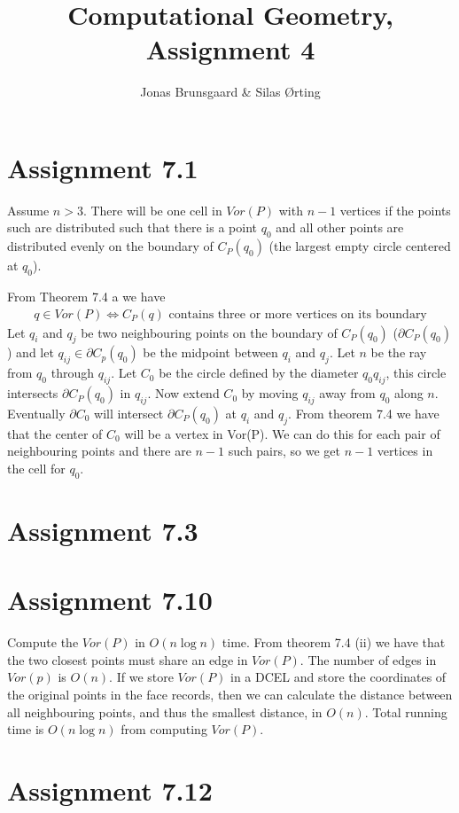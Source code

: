 \documentclass[10pt,a4paper,final,oneside,openany,article,oldfontcommands]{memoir}
\title{Computational Geometry, Assignment 4}
\author{
    Jonas Brunsgaard \& Silas Ørting
}
\begin{document}
\maketitle


\chapter*{Assignment 7.1}
Assume $n > 3$. There will be one cell in $Vor(P)$ with $n-1$ vertices if the points such are distributed such that there is a point $q_0$ and all other points are distributed evenly on the boundary of $C_P(q_0)$ (the largest empty circle centered at $q_0$).

From Theorem 7.4 a we have
\begin{align*}
  q \in Vor(P) \iff C_P(q) \text{ contains three or more vertices on its boundary}
\end{align*}
Let $q_i$ and $q_j$ be two neighbouring points on the boundary of $C_P(q_0)$ ($\partial C_P(q_0)$) and let $q_{ij} \in \partial C_p(q_0)$ be the midpoint between $q_i$ and $q_j$. Let $n$ be the ray from $q_0$ through $q_{ij}$. Let $C_0$ be the circle defined by the diameter $q_0q_{ij}$, this circle intersects $\partial C_P(q_0)$ in $q_{ij}$. Now extend $C_0$ by moving $q_{ij}$ away from $q_0$ along $n$. Eventually $\partial C_0$ will intersect $\partial C_P(q_0)$ at $q_i$ and $q_j$. From theorem 7.4 we have that the center of $C_0$ will be a vertex in Vor(P). We can do this for each pair of neighbouring points and there are $n-1$ such pairs, so we get $n-1$ vertices in the cell for $q_0$.

\chapter*{Assignment 7.3}


\chapter*{Assignment 7.10}
Compute the $Vor(P)$ in $O(n \log n)$ time. From theorem 7.4 (ii) we have that the two closest points must share an edge in $Vor(P)$. The number of edges in $Vor(p)$ is $O(n)$. If we store $Vor(P)$ in a DCEL and store the coordinates of the original points in the face records, then we can calculate the distance between all neighbouring points, and thus the smallest distance, in $O(n)$. Total running time is $O(n \log n)$ from computing $Vor(P)$.


\chapter*{Assignment 7.12}
\end{document}
